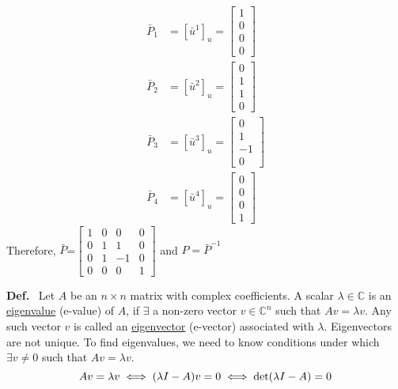 \documentclass[letterpaper]{article}
\begin{document}
    \begin{align*}
        \bar{P}_{1}&=[\bar{u}^{1}]_{u}=\left[\begin{array}{c}
            1\\
            0\\
            0\\
            0
        \end{array}\right]\\
        \bar{P}_{2}&=[\bar{u}^{2}]_{u}=\left[\begin{array}{c}
            0\\
            1\\
            1\\
            0
        \end{array}\right]\\
        \bar{P}_{3}&=[\bar{u}^{3}]_{u}=\left[\begin{array}{c}
            0\\
            1\\
            -1\\
            0
        \end{array}\right]\\
        \bar{P}_{4}&=[\bar{u}^{4}]_{u}=\left[\begin{array}{c}
            0\\
            0\\
            0\\
            1
        \end{array}\right]
    \end{align*}
    Therefore, $\bar{P}$=$\left[\begin{array}{cccc}
        1 & 0 & 0 & 0\\
        0 & 1 & 1 & 0\\
        0 & 1 & -1 & 0\\
        0 & 0 & 0 & 1
    \end{array}\right]$ and $P=\bar{P}^{-1}$

\noindent \textbf{Def.}~ Let $A$ be an $n\times n$ matrix with complex coefficients. A scalar $\lambda \in \mathbb{C} $ is an \underline{eigenvalue} (e-value) of $A$, if $\exists$ a non-zero vector $v \in \mathbb{C}^{n}$ such that $Av=\lambda v$. Any such vector $v$ is called an \underline{eigenvector} (e-vector) associated with $\lambda$. Eigenvectors are not unique.
    \newline\newline
    To find eigenvalues, we need to know conditions under which $\exists v\neq0$ such that $Av=\lambda v$.
    \begin{equation*}
        Av=\lambda v \iff(\lambda I-A)v=0\iff \textnormal{det}(\lambda I-A)=0
    \end{equation*}
\end{document}
